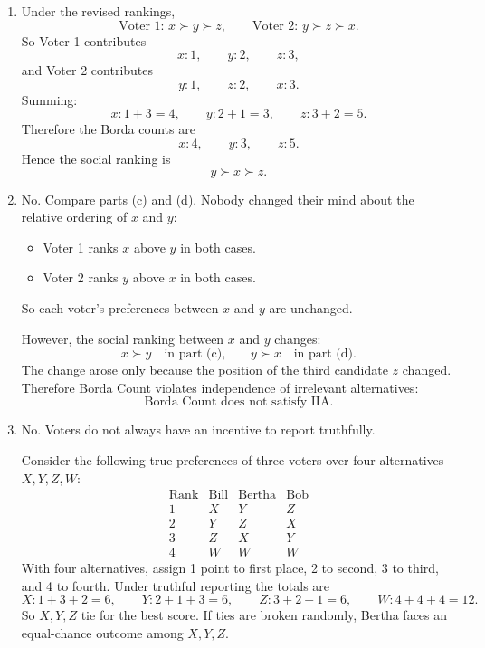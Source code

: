 \documentclass[12pt]{article}
\begin{document}
\begin{enumerate}[label=(\alph*)]
    \item
    Under the revised rankings,
    \[
    \text{Voter 1: } x \succ y \succ z,
    \qquad
    \text{Voter 2: } y \succ z \succ x.
    \]
    So Voter 1 contributes
    \[
    x:1,\qquad y:2,\qquad z:3,
    \]
    and Voter 2 contributes
    \[
    y:1,\qquad z:2,\qquad x:3.
    \]
    Summing:
    \[
    x:1+3=4,
    \qquad
    y:2+1=3,
    \qquad
    z:3+2=5.
    \]
    Therefore the Borda counts are
    \[
    \boxed{x:4,\qquad y:3,\qquad z:5.}
    \]
    Hence the social ranking is
    \[
    \boxed{y \succ x \succ z.}
    \]

    \item
    No. Compare parts (c) and (d). Nobody changed their mind about the relative ordering of $x$ and $y$:
    \begin{itemize}[leftmargin=*]
        \item Voter 1 ranks $x$ above $y$ in both cases.
        \item Voter 2 ranks $y$ above $x$ in both cases.
    \end{itemize}
    So each voter's preferences between $x$ and $y$ are unchanged.

    However, the social ranking between $x$ and $y$ changes:
    \[
    x \succ y \quad\text{in part (c),}
    \qquad
    y \succ x \quad\text{in part (d).}
    \]
    The change arose only because the position of the third candidate $z$ changed. Therefore Borda Count violates independence of irrelevant alternatives:
    \[
    \boxed{\text{Borda Count does not satisfy IIA.}}
    \]

    \item
    No. Voters do not always have an incentive to report truthfully.

    Consider the following true preferences of three voters over four alternatives $X,Y,Z,W$:
    \[
    \begin{array}{c|ccc}
    \text{Rank} & \text{Bill} & \text{Bertha} & \text{Bob} \\ \hline
    1 & X & Y & Z \\
    2 & Y & Z & X \\
    3 & Z & X & Y \\
    4 & W & W & W
    \end{array}
    \]
    With four alternatives, assign 1 point to first place, 2 to second, 3 to third, and 4 to fourth. Under truthful reporting the totals are
    \[
    X:1+3+2=6,
    \qquad
    Y:2+1+3=6,
    \qquad
    Z:3+2+1=6,
    \qquad
    W:4+4+4=12.
    \]
    So $X,Y,Z$ tie for the best score. If ties are broken randomly, Bertha faces an equal-chance outcome among $X,Y,Z$.


\end{enumerate}
\end{document}
